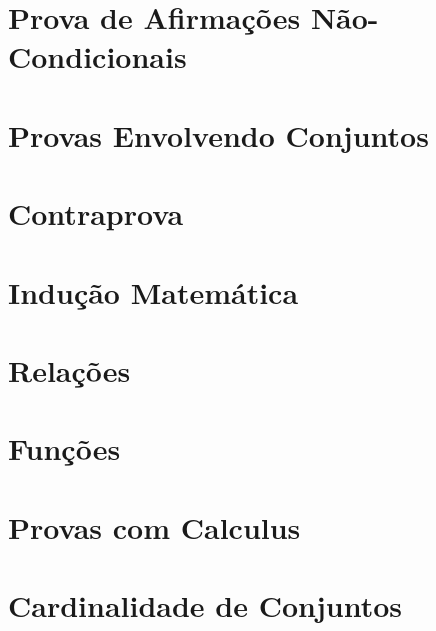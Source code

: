 \documentclass[a4paper,11pt]{book}
\theoremstyle{definition}
\begin{document}
\chapter{Prova de Afirmações Não-Condicionais}
\chapter{Provas Envolvendo Conjuntos}
\chapter{Contraprova}
\chapter{Indução Matemática}
\chapter{Relações}
\chapter{Funções}
\chapter{Provas com Calculus}
\chapter{Cardinalidade de Conjuntos}
\end{document}
